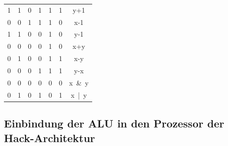 \documentclass[12pt]{report}
\begin{document}
\begin{table}[H]
\begin{tabular}{|C|C|C|C|C|C|C|}
    1                                                    & 1                                                   & 0                              & 1                              & 1                                          & 1          & y+1      \\
    0                                                    & 0                                                   & 1                              & 1                              & 1                                          & 0          & x-1      \\
    1                                                    & 1                                                   & 0                              & 0                              & 1                                          & 0          & y-1      \\
    0                                                    & 0                                                   & 0                              & 0                              & 1                                          & 0          & x+y      \\
    0                                                    & 1                                                   & 0                              & 0                              & 1                                          & 1          & x-y      \\
    0                                                    & 0                                                   & 0                              & 1                              & 1                                          & 1          & y-x      \\
    0                                                    & 0                                                   & 0                              & 0                              & 0                                          & 0          & x\ \&\ y \\
    0                                                    & 1                                                   & 0                              & 1                              & 0                                          & 1          & x\ |\ y  \\ \hline
  \end{tabular}
\end{table}
\subsection{Einbindung der ALU in den Prozessor der Hack-Architektur}
\end{document}
